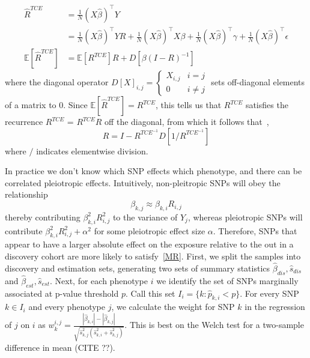 \documentclass{article}
\begin{document}
\begin{align*}
\hat{R}^{TCE} &= \frac{1}{N} (X\hat{\beta})^{\top} Y \\
  &= \frac{1}{N} (X\hat{\beta})^{\top} Y R + \frac{1}{N}(X\hat{\beta})^{\top} X \beta +
     \frac{1}{N}(X\hat{\beta})^{\top} \gamma + \frac{1}{N}(X\hat{\beta})^{\top} \epsilon \\
\mathbb{E}[\hat{R}^{TCE}]  &= \mathbb{E}[R^{TCE}] R + D[\beta (I-R)^{-1}]
\end{align*}
where the diagonal operator $D[X]_{i,j} = \left\{ \begin{array}{ll}
  X_{i,j} & i=j \\ 0 & i \neq j \end{array} \right.$ sets off-diagonal elements
  of a matrix to 0.
  Since $\mathbb{E}[\hat{R}^{TCE}] =R^{TCE}$,
this tells us that $R^{TCE}$ satisfies the recurrence
  $R^{TCE}$ = $R^{TCE} R$ off the diagonal, from
  which it follows that~\cite{Pachter},
\begin{equation}\label{r_cde}
R = I - R^{TCE^{-1}} D[1 / R^{TCE^{-1}}]
\end{equation}
where $/$ indicates elementwise division.

In practice we don't know which SNP effects which phenotype,
and there can be correlated pleiotropic effects.
Intuitively, non-pleitropic SNPs will obey the relationship
\begin{equation}\label{MR}
\beta_{k,j} \approx \beta_{k,i} R_{i,j}
\end{equation}
thereby contributing
$\beta_{k, i}^2 R_{i, j}^2$ to the variance of $Y_j$, whereas
pleiotropic SNPs will contribute $\beta_{k, i}^2 R_{i, j}^2 + \alpha^2$
for some pleiotropic effect size $\alpha$. Therefore, SNPs that appear to
have a larger absolute effect on the exposure relative to the out in a discovery 
cohort are more likely to satisfy~\ref{MR}.
 First, we split the samples
 into discovery and estimation sets, generating
two sets of summary statistics $\hat{\beta}_{dis}, \hat{s}_{dis}$ and
$\hat{\beta}_{est}, \hat{s}_{est}$. Next, for each
phenotype $i$ we identify the set of SNPs marginally associated at p-value threshold $p$.
Call this set $I_i = \{k: \hat{p}_{k, i} < p\}$. For every SNP $k \in I_i$ and
every phenotype $j$, we calculate the  weight for SNP $k$ in the regression of $j$ on $i$ as
$w^{i,j}_k = \frac{|\hat{\beta}_{k, i}| - |\hat{\beta}_{k, j}|}
  {\sqrt{\hat{s}_{k,j}^2 (\hat{s}^2_{k, i} + \hat{s}^2_{k, j})}}$. This
  is best on the Welch test for a two-sample difference in mean (CITE ??).
  
\end{document}

